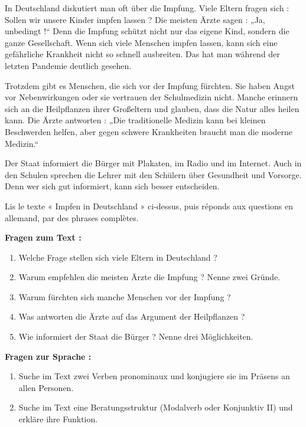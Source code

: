 \documentclass[11pt]{article}
\newcounter{popsec}
\newcounter{popsub}
\newcommand{\courssub}[1]{%
  \stepcounter{popsub}%
  \par\vspace{9pt}\noindent{\popxbold\fontsize{11.5}{13}\selectfont\color{popink}{\color{poporange}\thepopsec.\thepopsub}\hspace{6pt}#1}\par\nopagebreak\vspace{4pt}
}
\begin{document}
\courssub{Je me prépare au Bac}

\begin{textebox}
In Deutschland diskutiert man oft über die Impfung. Viele Eltern fragen sich : Sollen wir unsere Kinder impfen lassen ? Die meisten Ärzte sagen : „Ja, unbedingt !“ Denn die Impfung schützt nicht nur das eigene Kind, sondern die ganze Gesellschaft. Wenn sich viele Menschen impfen lassen, kann sich eine gefährliche Krankheit nicht so schnell ausbreiten. Das hat man während der letzten Pandemie deutlich gesehen.

Trotzdem gibt es Menschen, die sich vor der Impfung fürchten. Sie haben Angst vor Nebenwirkungen oder sie vertrauen der Schulmedizin nicht. Manche erinnern sich an die Heilpflanzen ihrer Großeltern und glauben, dass die Natur alles heilen kann. Die Ärzte antworten : „Die traditionelle Medizin kann bei kleinen Beschwerden helfen, aber gegen schwere Krankheiten braucht man die moderne Medizin.“

Der Staat informiert die Bürger mit Plakaten, im Radio und im Internet. Auch in den Schulen sprechen die Lehrer mit den Schülern über Gesundheit und Vorsorge. Denn wer sich gut informiert, kann sich besser entscheiden.
\end{textebox}

\begin{exercice}
Lis le texte « Impfen in Deutschland » ci-dessus, puis réponds aux questions en allemand, par des phrases complètes.

\textbf{Fragen zum Text :}
\begin{enumerate}
\item Welche Frage stellen sich viele Eltern in Deutschland ?
\item Warum empfehlen die meisten Ärzte die Impfung ? Nenne zwei Gründe.
\item Warum fürchten sich manche Menschen vor der Impfung ?
\item Was antworten die Ärzte auf das Argument der Heilpflanzen ?
\item Wie informiert der Staat die Bürger ? Nenne drei Möglichkeiten.
\end{enumerate}

\textbf{Fragen zur Sprache :}
\begin{enumerate}
\item Suche im Text zwei Verben pronominaux und konjugiere sie im Präsens an allen Personen.
\item Suche im Text eine Beratungsstruktur (Modalverb oder Konjunktiv II) und erkläre ihre Funktion.
\end{enumerate}
\end{exercice}
\end{document}
